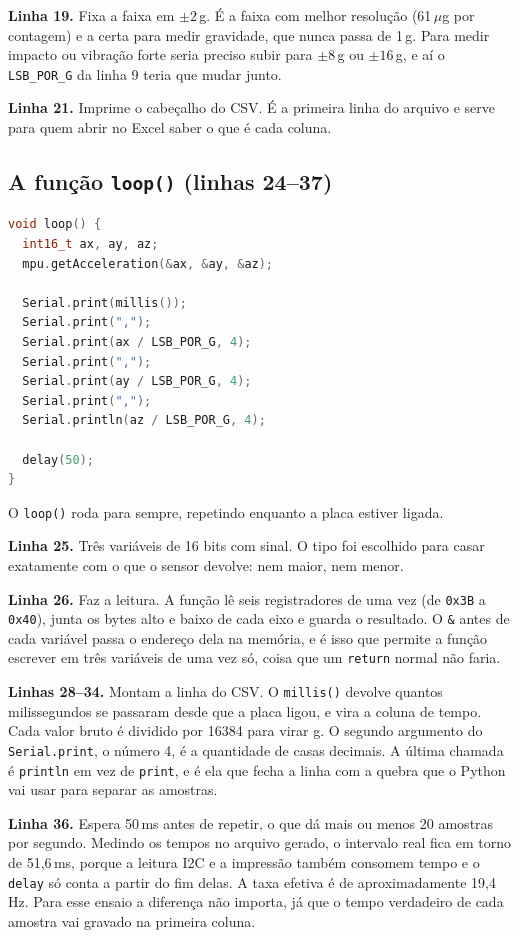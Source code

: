 \documentclass[11pt,a4paper]{article}
\begin{document}
\textbf{Linha 19.} Fixa a faixa em $\pm 2$\,g. É a faixa com melhor resolução
(61\,$\mu$g por contagem) e a certa para medir gravidade, que nunca passa de
1\,g. Para medir impacto ou vibração forte seria preciso subir para
$\pm 8$\,g ou $\pm 16$\,g, e aí o \texttt{LSB\_POR\_G} da linha 9 teria que
mudar junto.

\textbf{Linha 21.} Imprime o cabeçalho do CSV. É a primeira linha do arquivo e
serve para quem abrir no Excel saber o que é cada coluna.

\subsection{A função \texttt{loop()} (linhas 24--37)}

\begin{lstlisting}[language=C++,firstnumber=24]
void loop() {
  int16_t ax, ay, az;
  mpu.getAcceleration(&ax, &ay, &az);

  Serial.print(millis());
  Serial.print(",");
  Serial.print(ax / LSB_POR_G, 4);
  Serial.print(",");
  Serial.print(ay / LSB_POR_G, 4);
  Serial.print(",");
  Serial.println(az / LSB_POR_G, 4);

  delay(50);
}
\end{lstlisting}

O \texttt{loop()} roda para sempre, repetindo enquanto a placa estiver ligada.

\textbf{Linha 25.} Três variáveis de 16 bits com sinal. O tipo foi escolhido
para casar exatamente com o que o sensor devolve: nem maior, nem menor.

\textbf{Linha 26.} Faz a leitura. A função lê seis registradores de uma vez
(de \texttt{0x3B} a \texttt{0x40}), junta os bytes alto e baixo de cada eixo e
guarda o resultado. O \texttt{\&} antes de cada variável passa o endereço dela
na memória, e é isso que permite a função escrever em três variáveis de uma
vez só, coisa que um \texttt{return} normal não faria.

\textbf{Linhas 28--34.} Montam a linha do CSV. O \texttt{millis()} devolve
quantos milissegundos se passaram desde que a placa ligou, e vira a coluna de
tempo. Cada valor bruto é dividido por 16384 para virar g. O segundo
argumento do \texttt{Serial.print}, o número 4, é a quantidade de casas
decimais. A última chamada é \texttt{println} em vez de \texttt{print}, e é
ela que fecha a linha com a quebra que o Python vai usar para separar as
amostras.

\textbf{Linha 36.} Espera 50\,ms antes de repetir, o que dá mais ou menos 20
amostras por segundo. Medindo os tempos no arquivo gerado, o intervalo real
fica em torno de 51{,}6\,ms, porque a leitura I2C e a impressão também
consomem tempo e o \texttt{delay} só conta a partir do fim delas. A taxa
efetiva é de aproximadamente 19{,}4\,Hz. Para esse ensaio a diferença não
importa, já que o tempo verdadeiro de cada amostra vai gravado na primeira
coluna.
\end{document}
